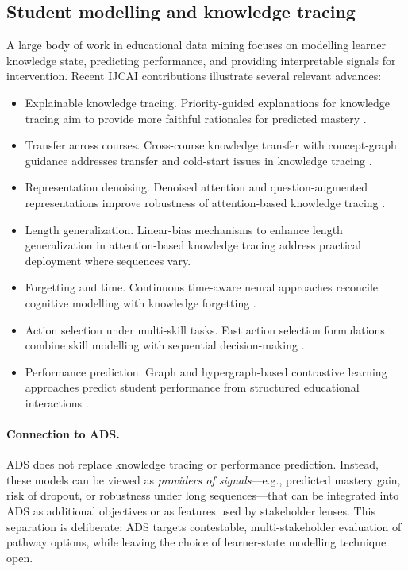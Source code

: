 \documentclass{article}
\begin{document}
\subsection{Student modelling and knowledge tracing}
\label{sec:rw-kt}

A large body of work in educational data mining focuses on modelling learner knowledge state, predicting performance, and providing interpretable signals for intervention.
Recent IJCAI contributions illustrate several relevant advances:
\begin{itemize}
    \item {Explainable knowledge tracing.} Priority-guided explanations for knowledge tracing aim to provide more faithful rationales for predicted mastery \cite{li2025pgexplainkt}.
    \item {Transfer across courses.} Cross-course knowledge transfer with concept-graph guidance addresses transfer and cold-start issues in knowledge tracing \cite{han2025transkt}.
    \item {Representation denoising.} Denoised attention and question-augmented representations improve robustness of attention-based knowledge tracing \cite{deng2025denoisekt}.
    \item {Length generalization.} Linear-bias mechanisms to enhance length generalization in attention-based knowledge tracing \cite{li2024stablekt} address practical deployment where sequences vary.
    \item {Forgetting and time.} Continuous time-aware neural approaches reconcile cognitive modelling with knowledge forgetting \cite{ma2022ctncm}.
    \item {Action selection under multi-skill tasks.} Fast action selection formulations combine skill modelling with sequential decision-making \cite{salomons2021bktpomdp}.
    \item {Performance prediction.} Graph and hypergraph-based contrastive learning approaches predict student performance from structured educational interactions \cite{song2025mhmgcl}.
\end{itemize}

\paragraph{Connection to ADS.}
ADS does not replace knowledge tracing or performance prediction.
Instead, these models can be viewed as \emph{providers of signals}---e.g., predicted mastery gain, risk of dropout, or robustness under long sequences---that can be integrated into ADS as additional objectives or as features used by stakeholder lenses.
This separation is deliberate: ADS targets contestable, multi-stakeholder evaluation of pathway options, while leaving the choice of learner-state modelling technique open.
\end{document}
